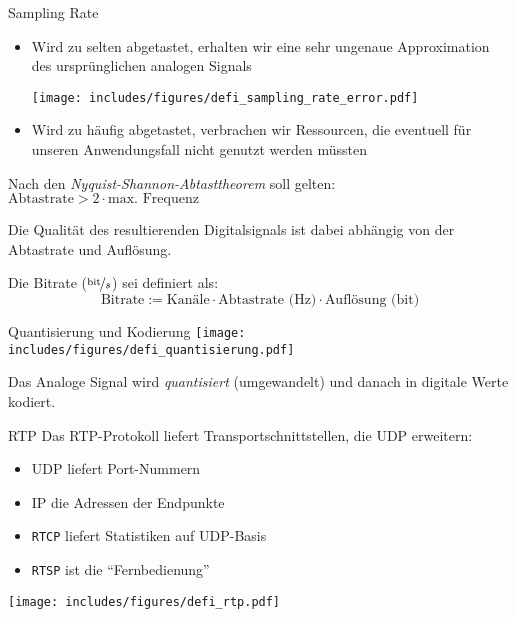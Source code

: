 \begin{defi}{Sampling Rate}
    \begin{itemize}
        \item Wird zu selten abgetastet, erhalten wir eine sehr ungenaue Approximation des ursprünglichen analogen Signals

              \begin{center}
                  \texttt{[image: includes/figures/defi\_sampling\_rate\_error.pdf]}
              \end{center}
        \item Wird zu häufig abgetastet, verbrachen wir Ressourcen, die eventuell für unseren Anwendungsfall nicht genutzt werden müssten
    \end{itemize}

    Nach den \emph{Nyquist-Shannon-Abtasttheorem} soll gelten: $\text{Abtastrate} > 2 \cdot \text{max. Frequenz}$

    Die Qualität des resultierenden Digitalsignals ist dabei abhängig von der Abtastrate und Auflösung.

    Die Bitrate ($\nicefrac{\text{bit}}{s}$) sei definiert als:
    \[
        \text{Bitrate} := \text{Kanäle} \cdot \text{Abtastrate (Hz)} \cdot \text{Auflösung (bit)}
    \]
\end{defi}

\begin{bonus}{Quantisierung und Kodierung}
    \texttt{[image: includes/figures/defi\_quantisierung.pdf]}

    Das Analoge Signal wird \emph{quantisiert} (umgewandelt) und danach in digitale Werte kodiert.
\end{bonus}

\begin{defi}{RTP}
    Das RTP-Protokoll liefert Transportschnittstellen, die UDP erweitern:
    \begin{itemize}
        \item UDP liefert Port-Nummern
        \item IP die Adressen der Endpunkte
        \item \texttt{RTCP} liefert Statistiken auf UDP-Basis
        \item \texttt{RTSP} ist die \enquote{Fernbedienung}
    \end{itemize}

    \begin{center}
        \texttt{[image: includes/figures/defi\_rtp.pdf]}
    \end{center}
\end{defi}

